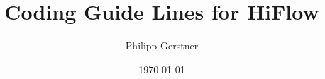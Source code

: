 \documentclass[a4paper]{scrartcl}
\begin{document}
   




\newcommand{\titel}{Coding Guide Lines for HiFlow} 
\newcommand{\name}{Philipp Gerstner}%

\title{\titel}
\author{\name}
\date{\today}

\maketitle	

\clearpage


\tableofcontents
\thispagestyle{empty}
\clearpage
\blankpage
{}
\clearpage
\thispagestyle{plain}




\clearpage

\printindex
\end{document}
